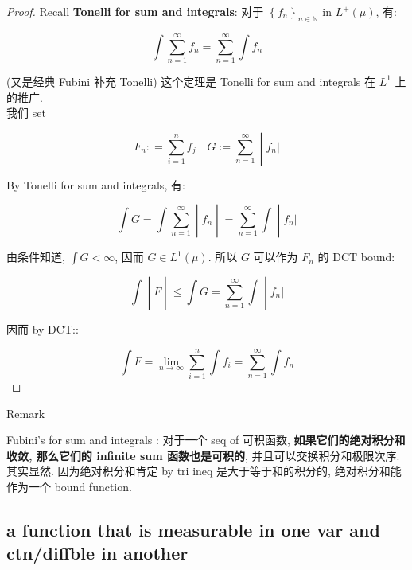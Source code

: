 \documentclass{qlnotes-export}
\begin{document}
\begin{proof}

Recall \textbf{Tonelli for sum and integrals}: 对于 \(\left\{ f_{n} \right\}_{n \in {\mathbb{N}}}\) in \(L^{+}(\mu)\), 有:

\[\int\sum\limits_{n = 1}^{\infty}f_{n} = \sum\limits_{n = 1}^{\infty}\int f_{n}\]

(又是经典 Fubini 补充 Tonelli) 这个定理是 Tonelli for sum and integrals 在 \(L^{1}\) 上的推广.\\
我们 set

\[\left. F_{n}: = \sum\limits_{i = 1}^{n}f_{j}\quad G := \sum\limits_{n = 1}^{\infty} \middle| f_{n}| \right.\]

By Tonelli for sum and integrals, 有:

\[\left. \int G = \int\sum\limits_{n = 1}^{\infty} \middle| f_{n} \middle| = \sum\limits_{n = 1}^{\infty}\int \middle| f_{n}| \right.\]

由条件知道, \(\int G < \infty\), 因而 \(G \in L^{1}(\mu)\). 所以 \(G\) 可以作为 \(F_{n}\) 的 DCT bound:

\[\left. \int \middle| F \middle| \leq \int G = \sum\limits_{n = 1}^{\infty}\int \middle| f_{n}| \right.\]

因而 by DCT::

\[\int F = \lim\limits_{n\rightarrow\infty}\sum\limits_{i = 1}^{n}\int f_{i} = \sum\limits_{n = 1}^{\infty}\int f_{n}\]

\end{proof}

\begin{qlremark}{Remark}

Fubini's for sum and integrals : 对于一个 seq of 可积函数, \textbf{如果它们的绝对积分和收敛, 那么它们的 infinite sum 函数也是可积的}, 并且可以交换积分和极限次序.\\
其实显然. 因为绝对积分和肯定 by tri ineq 是大于等于和的积分的, 绝对积分和能作为一个 bound function.

\end{qlremark}

\subsection{a function that is measurable in one var and ctn/diffble in another}\label{a-function-that-is-measurable-in-one-var-and-ctndiffble-in-another}
\end{document}
